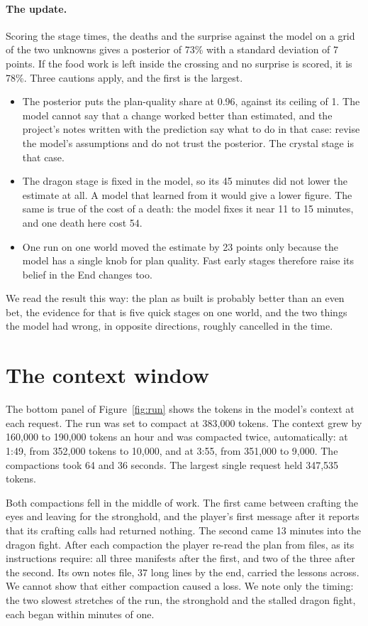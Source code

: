 \documentclass[11pt,a4paper]{article}
\begin{document}
\paragraph{The update.} Scoring the stage times, the deaths and the surprise against the model on a grid of the two unknowns gives a posterior of 73\% with a standard deviation of 7 points. If the food work is left inside the crossing and no surprise is scored, it is 78\%. Three cautions apply, and the first is the largest.
\begin{itemize}
\item The posterior puts the plan-quality share at 0.96, against its ceiling of 1. The model cannot say that a change worked better than estimated, and the project's notes written with the prediction say what to do in that case: revise the model's assumptions and do not trust the posterior. The crystal stage is that case.
\item The dragon stage is fixed in the model, so its 45 minutes did not lower the estimate at all. A model that learned from it would give a lower figure. The same is true of the cost of a death: the model fixes it near 11 to 15 minutes, and one death here cost 54.
\item One run on one world moved the estimate by 23 points only because the model has a single knob for plan quality. Fast early stages therefore raise its belief in the End changes too.
\end{itemize}
We read the result this way: the plan as built is probably better than an even bet, the evidence for that is five quick stages on one world, and the two things the model had wrong, in opposite directions, roughly cancelled in the time.

\section{The context window}
\label{sec:context}

The bottom panel of Figure~\ref{fig:run} shows the tokens in the model's context at each request. The run was set to compact at 383,000 tokens. The context grew by 160,000 to 190,000 tokens an hour and was compacted twice, automatically: at 1:49, from 352,000 tokens to 10,000, and at 3:55, from 351,000 to 9,000. The compactions took 64 and 36 seconds. The largest single request held 347,535 tokens.

Both compactions fell in the middle of work. The first came between crafting the eyes and leaving for the stronghold, and the player's first message after it reports that its crafting calls had returned nothing. The second came 13 minutes into the dragon fight. After each compaction the player re-read the plan from files, as its instructions require: all three manifests after the first, and two of the three after the second. Its own notes file, 37 long lines by the end, carried the lessons across. We cannot show that either compaction caused a loss. We note only the timing: the two slowest stretches of the run, the stronghold and the stalled dragon fight, each began within minutes of one.
\end{document}
